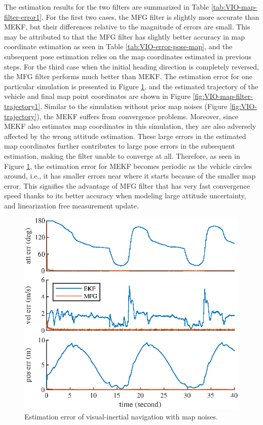 The estimation results for the two filters are summarized in Table \ref{tab:VIO-map-filter-error1}.
For the first two cases, the MFG filter is slightly more accurate than MEKF, but their differences relative to the magnitude of errors are small.
This may be attributed to that the MFG filter has slightly better accuracy in map coordinate estimation as seen in Table \ref{tab:VIO-error-pose-map}, and the subsequent pose estimation relies on the map coordinates estimated in previous steps.
For the third case when the initial heading direction is completely reversed, the MFG filter performs much better than MEKF.
The estimation error for one particular simulation is presented in Figure \ref{fig:VIO-map-filter-error1}, and the estimated trajectory of the vehicle and final map point coordinates are shown in Figure \ref{fig:VIO-map-filter-trajectory1}.
Similar to the simulation without prior map noises (Figure \ref{fig:VIO-trajectory}), the MEKF suffers from convergence problems.
Moreover, since MEKF also estimates map coordinates in this simulation, they are also adversely affected by the wrong attitude estimation.
These large errors in the estimated map coordinates further contributes to large pose errors in the subsequent estimation, making the filter unable to converge at all.
Therefore, as seen in Figure \ref{fig:VIO-map-filter-error1}, the estimation error for MEKF becomes periodic as the vehicle circles around, i.e., it has smaller errors near where it starts because of the smaller map error.
This signifies the advantage of MFG filter that has very fast convergence speed thanks to its better accuracy when modeling large attitude uncertainty, and linearization free measurement update.

\begin{figure}
	\centering
	\includegraphics[scale=1.3]{figures/VIO-map-filter-error1}
	\caption{Estimation error of visual-inertial navigation with map noises.}
	\label{fig:VIO-map-filter-error1}
\end{figure}

